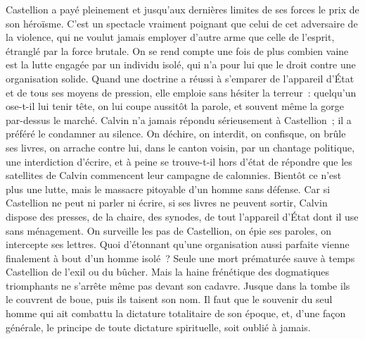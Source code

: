 \documentclass[french,twoside]{book} %
\begin{document}
Castellion a payé pleinement et jusqu’aux dernières limites de ses forces le prix de son héroïsme. C’est un spectacle vraiment poignant que celui de cet adversaire de la violence, qui ne voulut jamais employer d’autre arme que celle de l’esprit, étranglé par la force brutale. On se rend compte une fois de plus combien vaine est la lutte engagée par un individu isolé, qui n’a pour lui que le droit contre une organisation solide. Quand une doctrine a réussi à s’emparer de l’appareil d’État et de tous ses moyens de pression, elle emploie sans hésiter la terreur : quelqu’un ose-t-il lui tenir tête, on lui coupe aussitôt la parole, et souvent même la gorge par-dessus le marché. Calvin n’a jamais répondu sérieusement à Castellion ; il a préféré le condamner au silence. On déchire, on interdit, on confisque, on brûle ses livres, on arrache contre lui, dans le canton voisin, par un chantage politique, une interdiction d’écrire, et à peine se trouve-t-il hors d’état de répondre que les satellites de Calvin commencent leur campagne de calomnies. Bientôt ce n’est plus une lutte, mais le massacre pitoyable d’un homme sans défense. Car si Castellion ne peut ni parler ni écrire, si ses livres ne peuvent sortir, Calvin dispose des presses, de la chaire, des synodes, de tout l’appareil d’État dont il use sans ménagement. On surveille les pas de Castellion, on épie ses paroles, on intercepte ses lettres. Quoi d’étonnant qu’une organisation aussi parfaite vienne finalement à bout d’un homme isolé ? Seule une mort prématurée sauve à temps Castellion de l’exil ou du bûcher. Mais la haine frénétique des dogmatiques triomphants ne s’arrête même pas devant son cadavre. Jusque dans la tombe ils le couvrent de boue, puis ils taisent son nom. Il faut que le souvenir du seul homme qui ait combattu la dictature totalitaire de son époque, et, d’une façon générale, le principe de toute dictature spirituelle, soit oublié à jamais.\par
\end{document}
